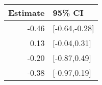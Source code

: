 \begin{tabular}{rl}
  \hline
Estimate & 95\% CI \\ 
  \hline
-0.46 & [-0.64,-0.28] \\ 
  0.13 & [-0.04,0.31] \\ 
  -0.20 & [-0.87,0.49] \\ 
  -0.38 & [-0.97,0.19] \\ 
   \hline
\end{tabular}

